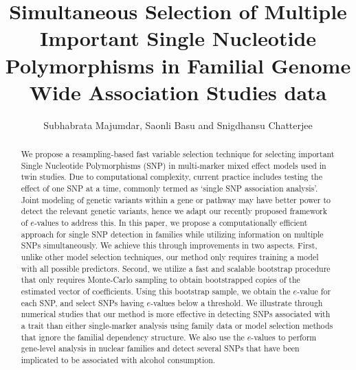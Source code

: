 \documentclass[aoas,preprint]{imsart}
\numberwithin{equation}{section}
\theoremstyle{definition}
\begin{document}

\begin{frontmatter}
\title{Simultaneous Selection of Multiple Important Single Nucleotide Polymorphisms in Familial Genome Wide Association Studies data}
\date{}
\author{Subhabrata Majumdar, Saonli Basu and Snigdhansu Chatterjee}
\maketitle

\begin{abstract}
We propose a resampling-based fast variable selection technique for selecting important Single Nucleotide Polymorphisms (SNP) in multi-marker mixed effect models used in twin studies. Due to computational complexity, current practice includes testing the effect of one SNP at a time, commonly termed as `single SNP association analysis'.  Joint modeling of genetic variants within a gene or pathway may have better power to detect the relevant genetic variants, hence we adapt our recently proposed framework of $e$-values to address this. In this paper, we propose a computationally efficient approach for single SNP detection in families while utilizing information on multiple SNPs simultaneously. We achieve this through improvements in two aspects. First, unlike other model selection techniques, our method only requires training a model with all possible predictors. Second, we utilize a fast and scalable bootstrap procedure that only requires Monte-Carlo sampling to obtain bootstrapped copies of the estimated vector of coefficients. Using this bootstrap sample, we obtain the $e$-value for each SNP, and select SNPs having $e$-values below a threshold. We illustrate through numerical studies that our method is more effective in detecting SNPs associated with a trait than either single-marker analysis using family data or model selection methods that ignore the familial dependency structure. We also use the $e$-values to perform gene-level analysis in nuclear families and detect several SNPs that have been implicated to be associated with alcohol consumption.
\end{abstract}

\begin{keyword}
\end{keyword}

\end{frontmatter}








%


\end{document}

